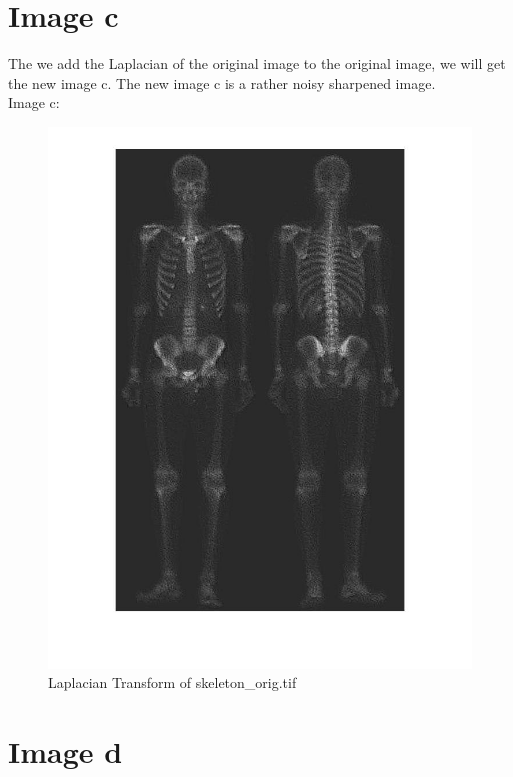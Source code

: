 \documentclass[11pt,oneside]{book}
\begin{document}
\section{Image c}
The we add the Laplacian of the original image to the original image, we will get the new image c. The new image c is a rather noisy sharpened image.\\
Image c:
\begin{figure}[!htb]
   \centering  
   \includegraphics[width=1.0\textwidth]{images/2/c.jpg}
   \caption{Laplacian Transform of skeleton\_orig.tif}  
\end{figure}

\section{Image d}
\end{document}
